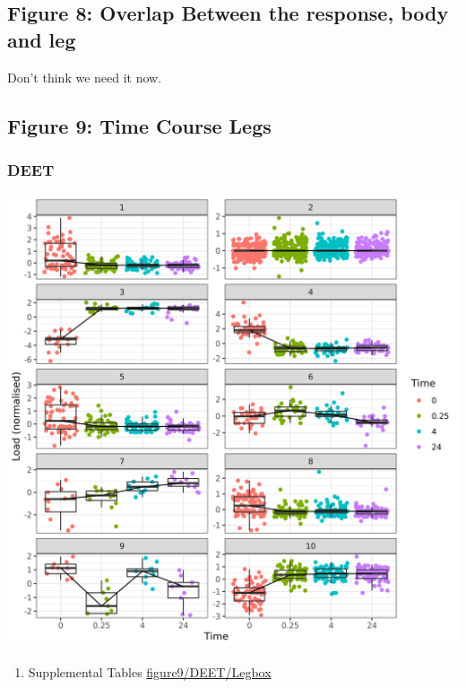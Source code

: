 \documentclass[11pt]{article}
\begin{document}
\subsection{Figure 8: Overlap Between the response, body and leg}
\label{sec:org16011ef}
Don't think we need it now.
\subsection{Figure 9: Time Course Legs}
\label{sec:orgef7159c}
\subsubsection{DEET}
\label{sec:org5eb2e98}
\begin{center}
\includegraphics[width=.9\linewidth]{figure9/DEET/Legbox.png}
\end{center}
\begin{enumerate}
\item Supplemental Tables
\label{sec:orgc722011}
\url{figure9/DEET/Legbox}
\end{enumerate}
\end{document}
